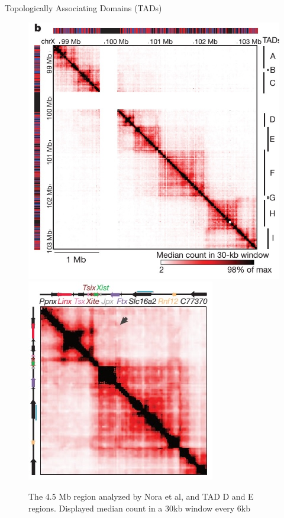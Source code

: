 \documentclass[8pt]{beamer}
\begin{document}
\begin{frame}{Topologically Associating Domains (TADs)}
\centering
\begin{figure}\label{fig:TADsOfTheXChromosome_NoraEtAl2012}
\includegraphics[scale=0.2]{TADsOfTheXChromosome_NoraEtAl2012}
\includegraphics[scale=0.3]{TadDandENoraEtAl2012}
\caption{The 4.5 Mb region analyzed by Nora et al, and TAD D and E regions. Displayed median count in a 30kb window every 6kb}
\end{figure}
\end{frame}
\end{document}
